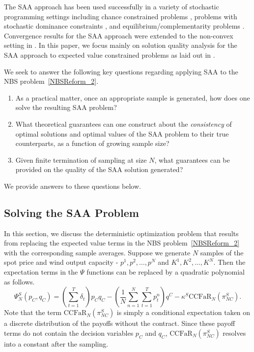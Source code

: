 The SAA approach has been used successfully in a variety of stochastic
programming settings including chance constrained problems
\citep{pagnoncelli2009sample}, problems with stochastic dominance constraints
\citep{hu2012sample}, and equilibrium/complementarity problems
\citep{gurkan1999sample,shapiro2008stochastic}. Convergence results for the SAA
approach were extended to the non-convex setting in
\cite{bastin_convergence_2006}.  In this paper, we focus mainly on solution
quality analysis for the SAA approach to expected value constrained
problems as laid out in \cite{wang_sample_2008}.

We seek to answer the following key questions regarding applying SAA to the NBS
problem~\eqref{NBSReform_2}.
\begin{enumerate}[label=(\roman*)]
	\item{As a practical matter, once an appropriate sample is generated, how does
		one solve the resulting SAA problem?}
	\item{What theoretical guarantees can one construct about the \emph{consistency}
		of optimal solutions and optimal values of the SAA problem to their true
		counterparts, as a function of growing sample size?}
	\item{Given finite termination of sampling at size $N$, what guarantees can be
		provided on the quality of the SAA solution generated?}
\end{enumerate}
We provide answers to these questions below.

\subsection{Solving the SAA Problem}

In this section, we discuss the deterministic optimization problem that results
from replacing the expected value terms in the NBS problem~\eqref{NBSReform_2}
with the corresponding sample averages. Suppose we generate $N$ samples of the
spot price and wind output capacity - $p^1, p^2, \ldots, p^N$ and $K^1, K^2,
\ldots, K^N$. Then the expectation terms in the $\Psi$ functions can be replaced
by a quadratic polynomial as follows.
\begin{equation}
\Psi_N^S(p_C, q_C) =  \displaystyle \left( \sum_{t=1}^T \delta_t  \right) p_C
q_C - \left( \frac{1}{N} \sum_{n=1}^N \sum_{t=1}^T p_t^n \right) q^C - \kappa^S
\text{CCFaR}_N(\pi_{NC}^S).
\end{equation}
Note that the term $\text{CCFaR}_N(\pi_{NC}^S)$ is simply a conditional
expectation taken on a discrete distribution of the payoffs without the
contract. Since these payoff terms do not contain the decision variables $p_C$
and $q_C$, $\text{CCFaR}_N(\pi_{NC}^S)$ resolves into a constant after the sampling.

